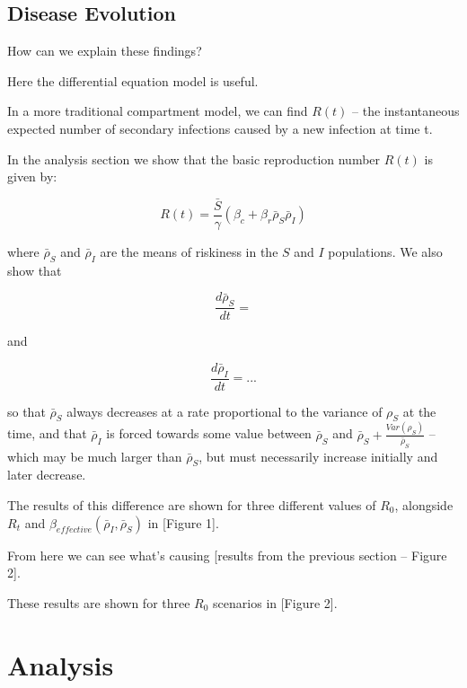 \documentclass{article}
\begin{document}

\subsection{Disease Evolution}

How can we explain these findings?

Here the differential equation model is useful.

In a more traditional compartment model, we can find $R(t)$ – the instantaneous
expected number of secondary infections caused by a new infection at time t.

In the analysis section we show that the basic reproduction number $R(t)$ is
given by:

$$R(t) = \frac{\bar S}{\gamma} \left( \beta_c
		+ \beta_r \bar \rho_S \bar \rho_I \right)$$

where $\bar\rho_S$ and $\bar\rho_I$ are the means of riskiness in the $S$ and
$I$ populations. We also show that


\begin{equation}
\frac{d\bar\rho_S}{dt} = 
\end{equation}

and

$$\frac{d\bar\rho_I}{dt} = ...$$

so that $\bar\rho_S$ always decreases at a rate proportional to the
variance of $\rho_S$ at the time, and that $\bar\rho_I$ is forced towards
some value between $\bar\rho_S$ and $\bar\rho_S + \frac{Var(\rho_S)}{\bar\rho_S}$
– which may be much larger than $\bar\rho_S$, but must necessarily increase
initially and later decrease.


The results of this difference are shown for three different values of $R_0$,
alongside $R_t$
and $\beta_{effective}(\bar\rho_I, \bar\rho_S)$ in [Figure 1].

From here we can see what's causing [results from the previous section – Figure 2].

These results are shown for three $R_0$ scenarios in [Figure 2].

\section{Analysis} 
\end{document}
